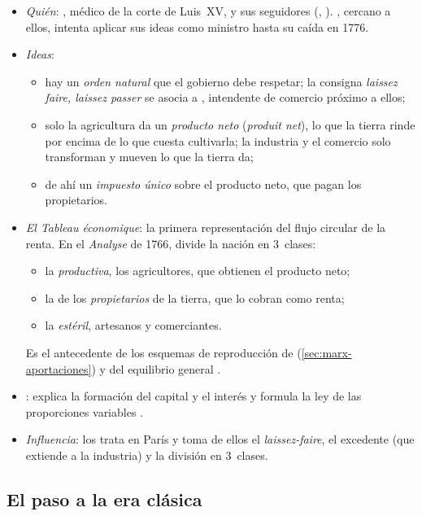 \documentclass[11pt]{article}
\begin{document}
\begin{itemize}
\item \emph{Quién}: , médico de la corte de Luis~XV, y sus seguidores (, ). , cercano a ellos, intenta aplicar sus ideas como ministro hasta su caída en 1776\nocite{HET2026Turgot}.
\item \emph{Ideas}:
  \begin{itemize}
  \item hay un \emph{orden natural} que el gobierno debe respetar; la consigna \emph{laissez faire, laissez passer} se asocia a , intendente de comercio próximo a ellos;
  \item solo la agricultura da un \emph{producto neto} (\emph{produit net}), lo que la tierra rinde por encima de lo que cuesta cultivarla; la industria y el comercio solo transforman y mueven lo que la tierra da;
  \item de ahí un \emph{impuesto único} sobre el producto neto, que pagan los propietarios\nocite{HET2026Quesnay}.
  \end{itemize}
\item \emph{El \emph{Tableau économique}}\nocite{Quesnay1758Tableau}: la primera representación del flujo circular de la renta. En el \emph{Analyse} de 1766,  divide la nación en 3~clases\nocite{Quesnay1766Analyse}:
  \begin{itemize}
  \item la \emph{productiva}, los agricultores, que obtienen el producto neto;
  \item la de los \emph{propietarios} de la tierra, que lo cobran como renta;
  \item la \emph{estéril}, artesanos y comerciantes.
  \end{itemize}
  Es el antecedente de los esquemas de reproducción de  (\ref{sec:marx-aportaciones}) y del equilibrio general .
\item \emph{}: explica la formación del capital y el interés\nocite{Turgot1766Reflexions} y formula la ley de las proporciones variables\nocite{Turgot1767Observations} .
\item \emph{Influencia}:  los trata en París y toma de ellos el \emph{laissez-faire}, el excedente (que extiende a la industria) y la división en 3~clases.
\end{itemize}

\subsection{El paso a la era clásica}\label{anexo:paso}
\end{document}
